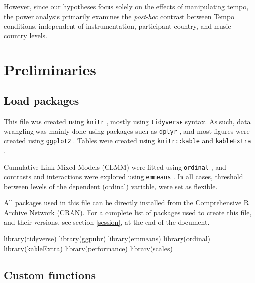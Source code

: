 \documentclass[
  bookmarksnumbered]{article}
\newenvironment{Shaded}{\begin{snugshade}}{\end{snugshade}}
\newcommand{\FunctionTok}[1]{\textcolor[rgb]{0.94,0.94,0.56}{#1}}
\newcommand{\NormalTok}[1]{\textcolor[rgb]{0.80,0.80,0.80}{#1}}
\begin{document}
However, since our hypotheses focus solely on the effects of manipulating tempo, the power analysis primarily examines the \emph{post-hoc} contrast between Tempo conditions, independent of instrumentation, participant country, and music country levels.

\hypertarget{preliminaries}{%
\section{Preliminaries}\label{preliminaries}}

\hypertarget{load-packages}{%
\subsection{Load packages}\label{load-packages}}

This file was created using \texttt{knitr} \autocite{knitrcit}, mostly using \texttt{tidyverse} \autocite{tidyversecit} syntax. As such, data wrangling was mainly done using packages such as \texttt{dplyr} \autocite{dplyrcit}, and most figures were created using \texttt{ggplot2} \autocite{ggplotcit}. Tables were created using \texttt{knitr::kable} and \texttt{kableExtra} \autocite{kableExtracit}.

Cumulative Link Mixed Models (CLMM) were fitted using \texttt{ordinal} \autocite{ordinalcit}, and contrasts and interactions were explored using \texttt{emmeans} \autocite{emmeanscit}. In all cases, threshold between levels of the dependent (ordinal) variable, were set as flexible.

All packages used in this file can be directly installed from the Comprehensive R Archive Network (\href{https://cran.r-project.org/}{CRAN}). For a complete list of packages used to create this file, and their versions, see section \ref{session}, at the end of the document.

\begin{Shaded}
\begin{Highlighting}[]
\FunctionTok{library}\NormalTok{(tidyverse)}
\FunctionTok{library}\NormalTok{(ggpubr)}
\FunctionTok{library}\NormalTok{(emmeans)}
\FunctionTok{library}\NormalTok{(ordinal)}
\FunctionTok{library}\NormalTok{(kableExtra)}
\FunctionTok{library}\NormalTok{(performance)}
\FunctionTok{library}\NormalTok{(scales)}
\end{Highlighting}
\end{Shaded}

\hypertarget{custom-functions}{%
\subsection{Custom functions}\label{custom-functions}}
\end{document}

